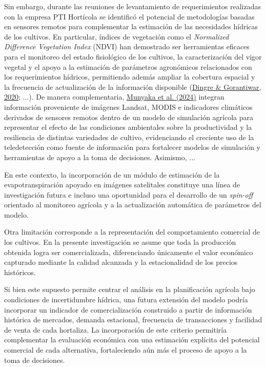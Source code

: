 \documentclass[12pt]{report}
\newcommand{\citeref}[2]{\hyperlink{ref:#1}{#2}}
\begin{document}
Sin embargo, durante las reuniones de levantamiento de requerimientos realizadas con la empresa PTI Hortícola se identificó el potencial de metodologías basadas en sensores remotos para complementar la estimación de las necesidades hídricas de los cultivos. En particular, índices de vegetación como el \textit{Normalized Difference Vegetation Index} (NDVI) han demostrado ser herramientas eficaces para el monitoreo del estado fisiológico de los cultivos, la caracterización del vigor vegetal y el apoyo a la estimación de parámetros agronómicos relacionados con los requerimientos hídricos, permitiendo además ampliar la cobertura espacial y la frecuencia de actualización de la información disponible (\citeref{dingre2020}{Dingre \& Gorantiwar, 2020}; ...). De manera complementaria, \citeref{munyaka2024}{Munyaka et al. (2024)} integran información proveniente de imágenes Landsat, MODIS e indicadores climáticos derivados de sensores remotos dentro de un modelo de simulación agrícola para representar el efecto de las condiciones ambientales sobre la productividad y la resiliencia de distintas variedades de cultivo, evidenciando el creciente uso de la teledetección como fuente de información para fortalecer modelos de simulación y herramientas de apoyo a la toma de decisiones. Asimismo, ...

En este contexto, la incorporación de un módulo de estimación de la evapotranspiración apoyado en imágenes satelitales constituye una línea de investigación futura e incluso una oportunidad para el desarrollo de un \textit{spin-off} orientado al monitoreo agrícola y a la actualización automática de parámetros del modelo.

Otra limitación corresponde a la representación del comportamiento comercial de los cultivos. En la presente investigación se asume que toda la producción obtenida logra ser comercializada, diferenciando únicamente el valor económico capturado mediante la calidad alcanzada y la estacionalidad de los precios históricos.

Si bien este supuesto permite centrar el análisis en la planificación agrícola bajo condiciones de incertidumbre hídrica, una futura extensión del modelo podría incorporar un indicador de comercialización construido a partir de información histórica de mercados, demanda estacional, frecuencia de transacciones y facilidad de venta de cada hortaliza. La incorporación de este criterio permitiría complementar la evaluación económica con una estimación explícita del potencial comercial de cada alternativa, fortaleciendo aún más el proceso de apoyo a la toma de decisiones.
\end{document}
